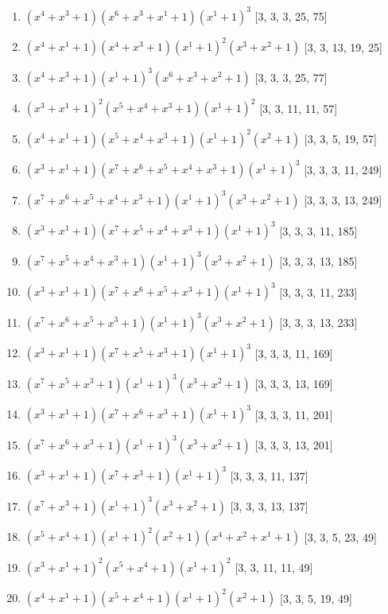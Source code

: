 \documentclass[10pt,twocolumn]{article}
\begin{document}
\begin{enumerate}
\item $(x^{4} + x^{3} + 1)(x^{6} + x^{3} + x^{1} + 1)(x^{1} + 1)^{3}$  [3, 3, 3, 25, 75]
\item $(x^{4} + x^{1} + 1)(x^{4} + x^{3} + 1)(x^{1} + 1)^{2}(x^{3} + x^{2} + 1)$  [3, 3, 13, 19, 25]
\item $(x^{4} + x^{3} + 1)(x^{1} + 1)^{3}(x^{6} + x^{3} + x^{2} + 1)$  [3, 3, 3, 25, 77]
\item $(x^{3} + x^{1} + 1)^{2}(x^{5} + x^{4} + x^{3} + 1)(x^{1} + 1)^{2}$  [3, 3, 11, 11, 57]
\item $(x^{4} + x^{1} + 1)(x^{5} + x^{4} + x^{3} + 1)(x^{1} + 1)^{2}(x^{2} + 1)$  [3, 3, 5, 19, 57]
\item $(x^{3} + x^{1} + 1)(x^{7} + x^{6} + x^{5} + x^{4} + x^{3} + 1)(x^{1} + 1)^{3}$  [3, 3, 3, 11, 249]
\item $(x^{7} + x^{6} + x^{5} + x^{4} + x^{3} + 1)(x^{1} + 1)^{3}(x^{3} + x^{2} + 1)$  [3, 3, 3, 13, 249]
\item $(x^{3} + x^{1} + 1)(x^{7} + x^{5} + x^{4} + x^{3} + 1)(x^{1} + 1)^{3}$  [3, 3, 3, 11, 185]
\item $(x^{7} + x^{5} + x^{4} + x^{3} + 1)(x^{1} + 1)^{3}(x^{3} + x^{2} + 1)$  [3, 3, 3, 13, 185]
\item $(x^{3} + x^{1} + 1)(x^{7} + x^{6} + x^{5} + x^{3} + 1)(x^{1} + 1)^{3}$  [3, 3, 3, 11, 233]
\item $(x^{7} + x^{6} + x^{5} + x^{3} + 1)(x^{1} + 1)^{3}(x^{3} + x^{2} + 1)$  [3, 3, 3, 13, 233]
\item $(x^{3} + x^{1} + 1)(x^{7} + x^{5} + x^{3} + 1)(x^{1} + 1)^{3}$  [3, 3, 3, 11, 169]
\item $(x^{7} + x^{5} + x^{3} + 1)(x^{1} + 1)^{3}(x^{3} + x^{2} + 1)$  [3, 3, 3, 13, 169]
\item $(x^{3} + x^{1} + 1)(x^{7} + x^{6} + x^{3} + 1)(x^{1} + 1)^{3}$  [3, 3, 3, 11, 201]
\item $(x^{7} + x^{6} + x^{3} + 1)(x^{1} + 1)^{3}(x^{3} + x^{2} + 1)$  [3, 3, 3, 13, 201]
\item $(x^{3} + x^{1} + 1)(x^{7} + x^{3} + 1)(x^{1} + 1)^{3}$  [3, 3, 3, 11, 137]
\item $(x^{7} + x^{3} + 1)(x^{1} + 1)^{3}(x^{3} + x^{2} + 1)$  [3, 3, 3, 13, 137]
\item $(x^{5} + x^{4} + 1)(x^{1} + 1)^{2}(x^{2} + 1)(x^{4} + x^{2} + x^{1} + 1)$  [3, 3, 5, 23, 49]
\item $(x^{3} + x^{1} + 1)^{2}(x^{5} + x^{4} + 1)(x^{1} + 1)^{2}$  [3, 3, 11, 11, 49]
\item $(x^{4} + x^{1} + 1)(x^{5} + x^{4} + 1)(x^{1} + 1)^{2}(x^{2} + 1)$  [3, 3, 5, 19, 49]

\end{enumerate}
\end{document}
